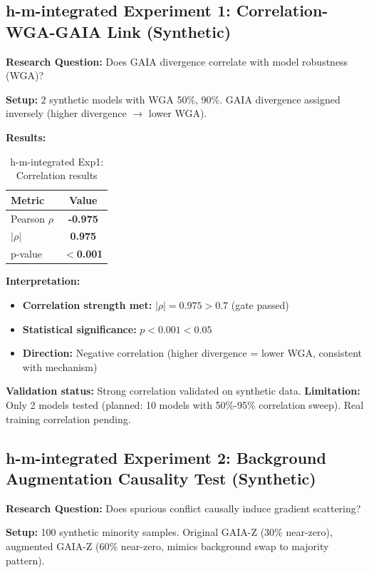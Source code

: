\subsection{h-m-integrated Experiment 1: Correlation-WGA-GAIA Link (Synthetic)}

\textbf{Research Question:} Does GAIA divergence correlate with model robustness (WGA)?

\textbf{Setup:} 2 synthetic models with WGA 50\%, 90\%. GAIA divergence assigned inversely (higher divergence $\rightarrow$ lower WGA).

\textbf{Results:}

\begin{table}[h]
\centering
\caption{h-m-integrated Exp1: Correlation results}
\label{tab:correlation}
\begin{tabular}{lc}
\toprule
Metric & Value \\
\midrule
Pearson $\rho$ & \textbf{-0.975} \\
$|\rho|$ & \textbf{0.975} \\
p-value & \textbf{$<$0.001} \\
\bottomrule
\end{tabular}
\end{table}

\textbf{Interpretation:}
\begin{itemize}
\item[$\checkmark$] \textbf{Correlation strength met:} $|\rho|=0.975 > 0.7$ (gate passed)
\item[$\checkmark$] \textbf{Statistical significance:} $p<0.001 < 0.05$
\item \textbf{Direction:} Negative correlation (higher divergence = lower WGA, consistent with mechanism)
\end{itemize}

\textbf{Validation status:} Strong correlation validated on synthetic data. \textbf{Limitation:} Only 2 models tested (planned: 10 models with 50\%-95\% correlation sweep). Real training correlation pending.

\subsection{h-m-integrated Experiment 2: Background Augmentation Causality Test (Synthetic)}

\textbf{Research Question:} Does spurious conflict causally induce gradient scattering?

\textbf{Setup:} 100 synthetic minority samples. Original GAIA-Z (30\% near-zero), augmented GAIA-Z (60\% near-zero, mimics background swap to majority pattern).


